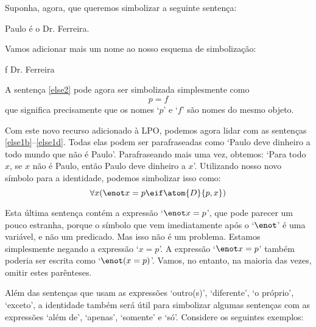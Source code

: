 Suponha, agora, que queremos simbolizar a seguinte sentença:
\begin{earg}
\item[\ex{else2}] Paulo é o Dr. Ferreira.
\end{earg}
Vamos adicionar mais um nome ao nosso esquema de simbolização:
	\begin{ekey}
		\item[f] Dr. Ferreira
	\end{ekey}
A sentença \ref{else2} pode agora ser simbolizada simplesmente como
$$p=f$$
que significa precisamente que os nomes `$p$' e `$f$' são nomes do mesmo objeto.

Com este novo recurso adicionado à LPO, podemos agora lidar com as sentenças \ref{else1b}--\ref{else1d}.
Todas elas podem ser parafraseadas como `Paulo deve dinheiro a todo mundo que não é Paulo'.
Parafraseando mais uma vez, obtemos:
`Para todo $x$, se $x$ não é Paulo, então Paulo deve dinheiro a $x$'.
Utilizando nosso novo símbolo para a identidade, podemos simbolizar isso como:
$$\forall x (\enot x = p \eif \atom{D}{p,x})$$

Esta última sentença contém a expressão `$\enot x = p$', que pode parecer um pouco estranha, porque o símbolo que vem imediatamente após o `$\enot$' é uma variável, e não um predicado.
Mas isso não é um problema.
Estamos simplesmente negando a expressão `$x = p$'.
A expressão `$\enot x = p$' também poderia ser escrita como `$\enot(x = p)$'.
Vamos, no entanto, na maioria das vezes, omitir estes parênteses.

Além das sentenças que usam as expressões `outro(s)', `diferente', `o próprio', `exceto', a identidade também será útil para simbolizar algumas sentenças com as expressões `além de', `apenas', `somente' e `só'.
Considere os seguintes exemplos:


